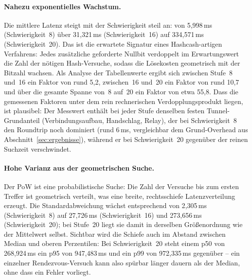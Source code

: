 \paragraph{Nahezu exponentielles Wachstum.} Die mittlere Latenz steigt mit der
Schwierigkeit steil an: von 5{,}998\,ms (Schwierigkeit~8) über 31{,}321\,ms
(Schwierigkeit~16) auf 334{,}571\,ms (Schwierigkeit~20). Das ist die erwartete
Signatur eines Hashcash-artigen Verfahrens: Jedes zusätzliche geforderte Nullbit
verdoppelt im Erwartungswert die Zahl der nötigen Hash-Versuche, sodass die
Lösekosten geometrisch mit der Bitzahl wachsen. Als Analyse der Tabellenwerte
ergibt sich zwischen Stufe~8 und~16 ein Faktor von rund 5{,}2, zwischen~16 und~20
ein Faktor von rund 10{,}7 und über die gesamte Spanne von~8 auf~20 ein Faktor
von etwa 55{,}8. Dass die gemessenen Faktoren unter dem rein rechnerischen
Verdopplungsprodukt liegen, ist plausibel: Der Messwert enthält bei jeder Stufe
denselben festen Tunnel-Grundanteil (Verbindungsaufbau, Handschlag, Relay), der
bei Schwierigkeit~8 den Roundtrip noch dominiert (rund 6\,ms, vergleichbar dem
Grund-Overhead aus Abschnitt~\ref{sec:ergebnisse}), während er bei
Schwierigkeit~20 gegenüber der reinen Suchzeit verschwindet.

\paragraph{Hohe Varianz aus der geometrischen Suche.} Der PoW ist eine
probabilistische Suche: Die Zahl der Versuche bis zum ersten Treffer ist
geometrisch verteilt, was eine breite, rechtsschiefe Latenzverteilung erzeugt.
Die Standardabweichung wächst entsprechend von 2{,}305\,ms (Schwierigkeit~8) auf
27{,}726\,ms (Schwierigkeit~16) und 273{,}656\,ms (Schwierigkeit~20); bei
Stufe~20 liegt sie damit in derselben Größenordnung wie der Mittelwert selbst.
Sichtbar wird die Schiefe auch im Abstand zwischen Median und oberen
Perzentilen: Bei Schwierigkeit~20 steht einem p50 von 268{,}924\,ms ein p95 von
947{,}483\,ms und ein p99 von 972{,}335\,ms gegenüber -- ein einzelner
Rendezvous-Versuch kann also spürbar länger dauern als der Median, ohne dass ein
Fehler vorliegt.


